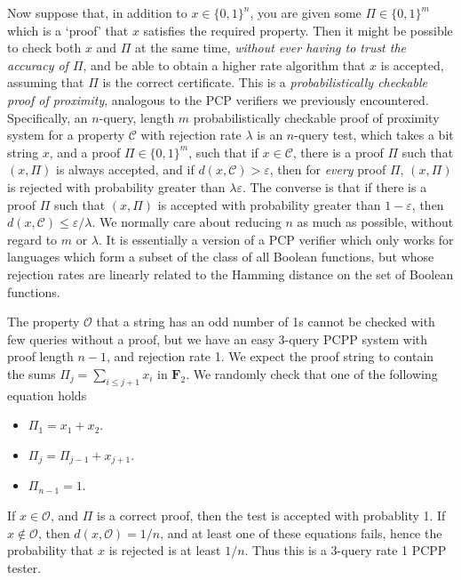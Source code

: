 Now suppose that, in addition to $x \in \{ 0, 1 \}^n$, you are given some $\Pi \in \{ 0, 1 \}^m$ which is a `proof' that $x$ satisfies the required property. Then it might be possible to check both $x$ and $\Pi$ at the same time, {\it without ever having to trust the accuracy of $\Pi$}, and be able to obtain a higher rate algorithm that $x$ is accepted, assuming that $\Pi$ is the correct certificate. This is a \emph{probabilistically checkable proof of proximity}, analogous to the PCP verifiers we previously encountered. Specifically, an $n$-query, length $m$ probabilistically checkable proof of proximity system for a property $\mathcal{C}$ with rejection rate $\lambda$ is an $n$-query test, which takes a bit string $x$, and a proof $\Pi \in \{ 0, 1 \}^m$, such that if $x \in \mathcal{C}$, there is a proof $\Pi$ such that $(x,\Pi)$ is always accepted, and if $d(x,\mathcal{C}) > \varepsilon$, then for {\it every} proof $\Pi$, $(x,\Pi)$ is rejected with probability greater than $\lambda \varepsilon$. The converse is that if there is a proof $\Pi$ such that $(x,\Pi)$ is accepted with probability greater than $1 - \varepsilon$, then $d(x,\mathcal{C}) \leq \varepsilon/\lambda$. We normally care about reducing $n$ as much as possible, without regard to $m$ or $\lambda$. It is essentially a version of a PCP verifier which only works for languages which form a subset of the class of all Boolean functions, but whose rejection rates are linearly related to the Hamming distance on the set of Boolean functions.

\begin{example}
    The property $\mathcal{O}$ that a string has an odd number of 1s cannot be checked with few queries without a proof, but we have an easy 3-query PCPP system with proof length $n-1$, and rejection rate 1. We expect the proof string to contain the sums $\Pi_j = \sum_{i \leq j+1} x_i$ in $\mathbf{F}_2$. We randomly check that one of the following equation holds
    \begin{itemize}
        \item $\Pi_1 = x_1 + x_2$.
        \item $\Pi_j = \Pi_{j-1} + x_{j+1}$.
        \item $\Pi_{n-1} = 1$.
    \end{itemize}
    If $x \in \mathcal{O}$, and $\Pi$ is a correct proof, then the test is accepted with probablity 1. If $x \not \in \mathcal{O}$, then $d(x,\mathcal{O}) = 1/n$, and at least one of these equations fails, hence the probability that $x$ is rejected is at least $1/n$. Thus this is a 3-query rate 1 PCPP tester.
\end{example}

